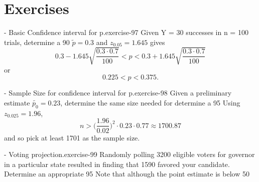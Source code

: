 \documentclass[10pt,]{book}
\numberwithin{equation}{section}
\newcommand{\lt}{<}
\newcommand{\gt}{>}
\begin{document}
\section[{Exercises}]{Exercises}\label{section-71}
\hypertarget{p-1418}{}%
\begin{inlineexercise}{- Basic Confidence interval for p.}{exercise-97}%
\hypertarget{p-1419}{}%
Given Y = 30 successes in n = 100 trials, determine a 90%
\hypertarget{p-1420}{}%
\(\tilde{p} = 0.3\) and \(z_{0.05} = 1.645\) gives%
\begin{equation*}
0.3 - 1.645 \sqrt{\frac{0.3 \cdot 0.7}{100}} \lt p \lt 0.3 + 1.645 \sqrt{\frac{0.3 \cdot 0.7}{100}}
\end{equation*}
or%
\begin{equation*}
0.225 \lt p \lt 0.375.
\end{equation*}
%
%
\end{inlineexercise}
 \begin{inlineexercise}{- Sample Size for confidence interval for p.}{exercise-98}%
\hypertarget{p-1421}{}%
Given a preliminary estimate \(\tilde{p_0} = 0.23\), determine the same size needed for determine a 95%
\hypertarget{p-1422}{}%
Using \(z_{0.025} = 1.96\),%
\begin{equation*}
n \gt \big ( \frac{1.96}{0.02} \big )^2 \cdot 0.23 \cdot 0.77 \approx 1700.87
\end{equation*}
and so pick at least 1701 as the sample size.%
%
\end{inlineexercise}
 \begin{inlineexercise}{- Voting projection.}{exercise-99}%
\hypertarget{p-1423}{}%
Randomly polling 3200 eligible voters for governor in a particular state resulted in finding that 1590 favored your candidate. Determine an appropriate 95%
\hypertarget{p-1424}{}%
Note that although the point estimate is below 50%
%
\end{inlineexercise}
\end{document}
